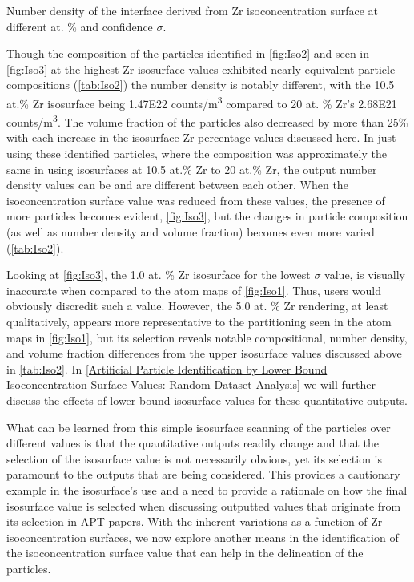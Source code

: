 		\begin{table}[]
			\caption{Number density of the interface derived from Zr isoconcentration surface at different at. \% and confidence $\sigma${}.}
			
			\label{tab:Iso2}
		\end{table}
		
		Though the composition of the particles identified in \ref{fig:Iso2} and seen in \ref{fig:Iso3} at the highest Zr isosurface values exhibited nearly equivalent particle compositions (\ref{tab:Iso2}) the number density is notably different, with the 10.5 at.\% Zr isosurface being 1.47E22 counts/m\textsuperscript{3} compared to 20 at. \% Zr’s 2.68E21 counts/m\textsuperscript{3}. The volume fraction of the particles also decreased by more than 25\% with each increase in the isosurface Zr percentage values discussed here. In just using these identified particles, where the composition was approximately the same in using isosurfaces at 10.5 at.\% Zr to 20 at.\% Zr, the output number density values can be and are different between each other. When the isoconcentration surface value was reduced from these values, the presence of more particles becomes evident, \ref{fig:Iso3}, but the changes in particle composition (as well as number density and volume fraction) becomes even more varied (\ref{tab:Iso2}).
		 
		Looking at \ref{fig:Iso3}, the 1.0 at. \% Zr isosurface for the lowest $\sigma${} value, is visually inaccurate when compared to the atom maps of \ref{fig:Iso1}. Thus, users would obviously discredit such a value. However, the 5.0 at. \% Zr rendering, at least qualitatively, appears more representative to the partitioning seen in the atom maps in \ref{fig:Iso1}, but its selection reveals notable compositional, number density, and volume fraction differences from the upper isosurface values discussed above in \ref{tab:Iso2}. In \ref{Artificial Particle Identification by Lower Bound Isoconcentration Surface Values: Random Dataset Analysis} we will further discuss the effects of lower bound isosurface values for these quantitative outputs. 
		
		What can be learned from this simple isosurface scanning of the particles over different values is that the quantitative outputs readily change and that the selection of the isosurface value is not necessarily obvious, yet its selection is paramount to the outputs that are being considered. This provides a cautionary example in the isosurface’s use and a need to provide a rationale on how the final isosurface value is selected when discussing outputted values that originate from its selection in APT papers. With the inherent variations as a function of Zr isoconcentration surfaces, we now explore another means in the identification of the isoconcentration surface value that can help in the delineation of the particles.

